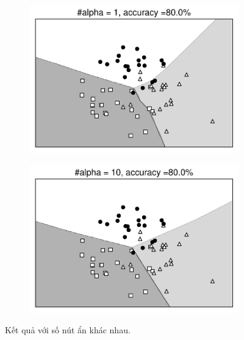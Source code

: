 \begin{figure}[t]
\begin{subfigure}{0.45\textwidth}
\includegraphics[width=0.99\linewidth]{ebookML_src/src/mlp/nn_overfitting_1.pdf}
\caption{}
\end{subfigure}
\begin{subfigure}{0.45\textwidth}
\includegraphics[width=0.99\linewidth]{ebookML_src/src/mlp/nn_overfitting_10.pdf}
\caption{}
\end{subfigure}
\caption{
Kết quả với số nút ẩn khác nhau.
}
\label{fig:14_11}
\end{figure}




